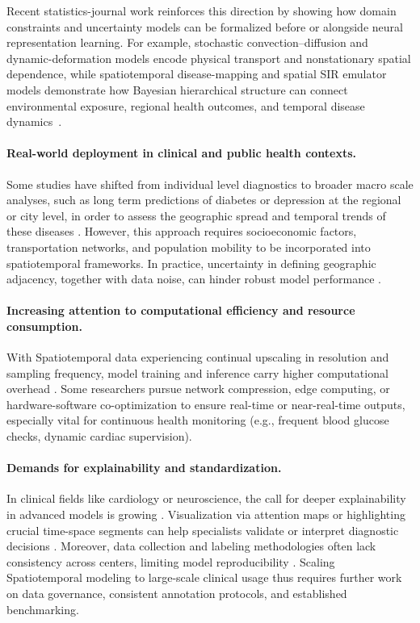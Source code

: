 \documentclass[acmsmall]{acmart}
\begin{document}
Recent statistics-journal work reinforces this direction by showing how domain constraints and uncertainty models can be formalized before or alongside neural representation learning. For example, stochastic convection--diffusion and dynamic-deformation models encode physical transport and nonstationary spatial dependence, while spatiotemporal disease-mapping and spatial SIR emulator models demonstrate how Bayesian hierarchical structure can connect environmental exposure, regional health outcomes, and temporal disease dynamics~\cite{liu2022convectionDiffusion,castroMorales2025dynamicDeformation,wang2024respiratoryDiseaseMapping,trostle2024spatialSIR,wikle2023statisticalDeepLearning}.

\paragraph{Real-world deployment in clinical and public health contexts.}
Some studies have shifted from individual level diagnostics to broader macro scale analyses, such as long term predictions of diabetes or depression at the regional or city level, in order to assess the geographic spread and temporal trends of these diseases \cite{3}. However, this approach requires socioeconomic factors, transportation networks, and population mobility to be incorporated into spatiotemporal frameworks. In practice, uncertainty in defining geographic adjacency, together with data noise, can hinder robust model performance \cite{2,3}.

\paragraph{Increasing attention to computational efficiency and resource consumption.}
With Spatiotemporal data experiencing continual upscaling in resolution and sampling frequency, model training and inference carry higher computational overhead \cite{5,7}. Some researchers pursue network compression, edge computing, or hardware-software co-optimization to ensure real-time or near-real-time outputs, especially vital for continuous health monitoring (e.g., frequent blood glucose checks, dynamic cardiac supervision).

\paragraph{Demands for explainability and standardization.}
In clinical fields like cardiology or neuroscience, the call for deeper explainability in advanced models is growing \cite{4,6}. Visualization via attention maps or highlighting crucial time-space segments can help specialists validate or interpret diagnostic decisions \cite{2,4}. Moreover, data collection and labeling methodologies often lack consistency across centers, limiting model reproducibility \cite{6}. Scaling Spatiotemporal modeling to large-scale clinical usage thus requires further work on data governance, consistent annotation protocols, and established benchmarking.
\end{document}
